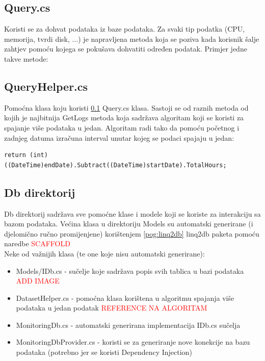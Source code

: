 \documentclass[zavrsnirad]{fer}
\begin{document}
\subsection{Query.cs}
\label{pog:query.cs}
Koristi se za dohvat podataka iz baze podataka. Za svaki tip podatka (CPU, memorija, tvrdi disk, ...) je napravljena metoda koja se poziva kada korisnik šalje zahtjev pomoću kojega se pokušava dohvatiti određen podatak. Primjer jedne takve metode:


\subsection{QueryHelper.cs}
Pomoćna klasa koju koristi \ref{pog:query.cs} Query.cs klasa. Sastoji se od raznih metoda od kojih je najbitnija GetLogs metoda koja sadržava algoritam koji se koristi za spajanje više podataka u jedan. Algoritam radi tako da pomoću početnog i zadnjeg datuma izračuna interval unutar kojeg se podaci spajaju u jedan:
\begin{lstlisting}[language=CSharp, title=Izračun intervala]
return (int)((DateTime)endDate).Subtract((DateTime)startDate).TotalHours;
\end{lstlisting}



\subsection{Db direktorij}
Db direktorij sadržava sve pomoćne klase i modele koji se koriste za interakciju sa bazom podataka. Većina klasa u direktoriju Models su automatski generirane (i djelomično ručno promijenjene) korištenjem \ref{pog:linq2db} linq2db paketa pomoću naredbe \textcolor{red}{SCAFFOLD}
\\Neke od važnijih klasa (te one koje nisu automatski generirane):
\begin{itemize}
	\item Models/IDb.cs - sučelje koje sadržava popis svih tablica u bazi podataka \textcolor{red}{ADD IMAGE}
	\item DatasetHelper.cs - pomoćna klasa korištena u algoritmu spajanja više podataka u jedan podatak \textcolor{red}{REFERENCE NA ALGORITAM}
	\item MonitoringDb.cs - automatski generirana implementacija IDb.cs sučelja
	\item MonitoringDbProvider.cs - koristi se za generiranje nove konekcije na bazu podataka (potrebno jer se koristi Dependency Injection)
\end{itemize}
\end{document}
